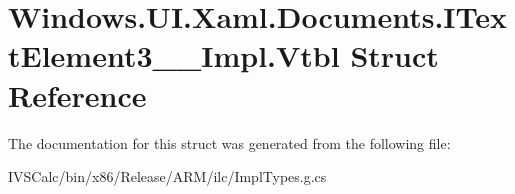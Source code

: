 \hypertarget{struct_windows_1_1_u_i_1_1_xaml_1_1_documents_1_1_i_text_element3_____impl_1_1_vtbl}{}\section{Windows.\+U\+I.\+Xaml.\+Documents.\+I\+Text\+Element3\+\_\+\+\_\+\+Impl.\+Vtbl Struct Reference}
\label{struct_windows_1_1_u_i_1_1_xaml_1_1_documents_1_1_i_text_element3_____impl_1_1_vtbl}


The documentation for this struct was generated from the following file\+:\begin{DoxyCompactItemize}
\item 
I\+V\+S\+Calc/bin/x86/\+Release/\+A\+R\+M/ilc/Impl\+Types.\+g.\+cs\end{DoxyCompactItemize}
